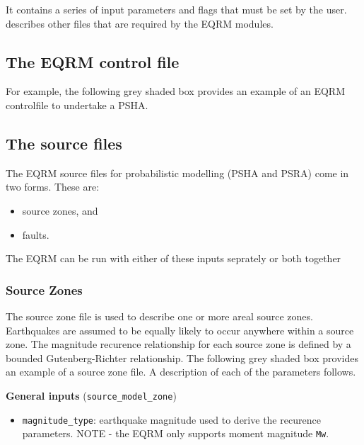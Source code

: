It contains a series of input parameters and flags that must be set
by the user.  describes other files
that are required by the EQRM modules.

\subsection{The EQRM control file}
\label{sec:application-EQRMcf}




\clearpage For example, the following grey shaded box provides an
example of an EQRM controlfile to undertake a PSHA.




\clearpage
\subsection{The source files}

The EQRM source files for probabilistic modelling (PSHA and PSRA)
come in two forms. These are:
\begin{itemize}
\item source zones, and
\item faults.
\end{itemize}
The EQRM can be run with either of these inputs seprately or both
together


\subsubsection{Source Zones}
\label{sec:source-zone-file}

The source zone file is used to describe one or more areal source
zones. Earthquakes are assumed to be equally likely to occur
anywhere within a source zone. The magnitude recurence relationship
for each source zone is defined by a bounded Gutenberg-Richter
relationship. The following grey shaded box provides an example of a
source zone file. A description of each of the parameters follows.


\textbf{General inputs} (\texttt{source\_model\_zone})
\begin{itemize}
\item \texttt{magnitude\_type}: earthquake magnitude used to derive the
recurence parameters. NOTE - the EQRM only supports moment magnitude
\texttt{Mw}.
\end{itemize}

